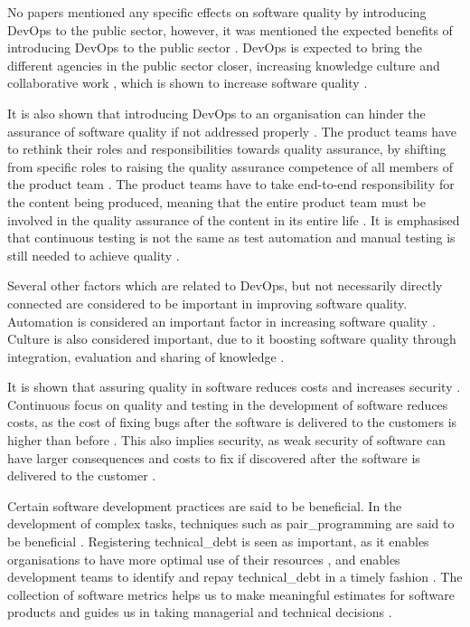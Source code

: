 No papers mentioned any specific effects on software quality by introducing DevOps to the public sector, however, it was mentioned the expected benefits of introducing DevOps to the public sector \cite{mm_2021}. DevOps is expected to bring the different agencies in the public sector closer, increasing knowledge culture and collaborative work \cite{mm_2021}, which is shown to increase software quality \cite{smm_2018}.

It is also shown that introducing DevOps to an organisation can hinder the assurance of software quality if not addressed properly \cite{dsc_2019}. The product teams have to rethink their roles and responsibilities towards quality assurance, by shifting from specific roles to raising the quality assurance competence of all members of the product team \cite{dsc_2019}. The product teams have to take end-to-end responsibility for the content being produced, meaning that the entire product team must be involved in the quality assurance of the content in its entire life \cite{dsc_2019}. It is emphasised that continuous testing is not the same as test automation and manual testing is still needed to achieve quality \cite{dsc_2019}.

Several other factors which are related to DevOps, but not necessarily directly connected are considered to be important in improving software quality. Automation is considered an important factor in increasing software quality \cite{smm_2018}. Culture is also considered important, due to it boosting software quality through integration, evaluation and sharing of knowledge \cite{smm_2018}.

It is shown that assuring quality in software reduces costs and increases security \cite{csw_2011}. Continuous focus on quality and testing in the development of software reduces costs, as the cost of fixing bugs after the software is delivered to the customers is higher than before \cite{csw_2011}. This also implies security, as weak security of software can have larger consequences and costs to fix if discovered after the software is delivered to the customer \cite{csw_2011}. 

Certain software development practices are said to be beneficial. In the development of complex tasks, techniques such as \gls{pair_programming} are said to be beneficial \cite{jeh_2009}. Registering \gls{technical_debt} is seen as important, as it enables organisations to have more optimal use of their resources \cite{mv_2022}, and enables development teams to identify and repay \gls{technical_debt} in a timely fashion \cite{mv_2022}. The collection of software metrics helps us to make meaningful estimates for software products and guides us in taking managerial and technical decisions \cite{jkc_2010}.

